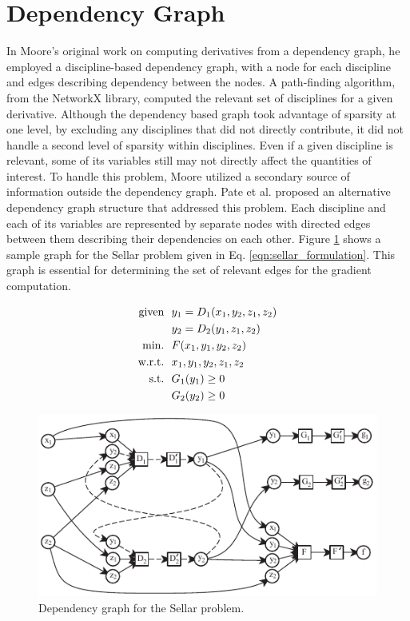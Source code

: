\documentclass[]{aiaa-tc} %
\newcommand{\txt}{\textrm}
\begin{document}
  \section{Dependency Graph}\label{section:depgraph}

    In Moore's original work on computing derivatives from a dependency graph, he employed
    a discipline-based dependency graph, with a node for each discipline and edges describing
    dependency between the nodes. A path-finding algorithm, from the NetworkX library\cite{hagberg-2008-exploring},
    computed the relevant set of disciplines for a given derivative. Although the dependency based graph took advantage of sparsity at
    one level, by excluding any disciplines that did not directly contribute, it did not handle a second level of sparsity
    within disciplines. Even if a given discipline is relevant, some of its variables still may not 
    directly affect the quantities of interest. To handle this problem, Moore utilized a secondary source of information 
    outside the dependency graph. Pate et al. proposed an alternative dependency graph
    structure that addressed this problem\cite{graph_problem2013}. Each discipline and each of its variables are
    represented by separate nodes with directed edges between them describing their dependencies on each other.
    Figure \ref{fig:sellar_graph} shows a sample graph for the Sellar problem \cite{AIAA:sellar}
    given in Eq. \ref{eqn:sellar_formulation}. This graph is essential for determining the set of relevant edges 
    for the gradient computation.

    \begin{align}
        \txt{given} & \ \ y_1 = D_1(x_1,y_2,z_1,z_2) \notag
        \\      & \ \ y_2 = D_2(y_1,z_1,z_2) \notag
        \\\txt{min.} &\ \ F(x_1,y_1,y_2,z_2) \notag
        \\\txt{w.r.t.} & \ \ x_1,y_1,y_2,z_1,z_2 \notag
        \\\txt{s.t.} & \ \ G_1(y_1) \geq 0 \notag
        \\     & \ \ G_2(y_2) \geq 0
        \label{eqn:sellar_formulation}
    \end{align}

    \begin{figure}[!htb]\begin{center}
      \includegraphics[width=.8\textwidth]{images/sellar_cycles}
      \caption{ Dependency graph for the Sellar problem. \label{fig:sellar_graph}}
    \end{center}\end{figure}
\end{document}
